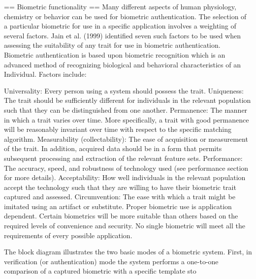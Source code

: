 \documentclass[12pt,a4paper]{report}
\begin{document}
== Biometric functionality ==
Many different aspects of human physiology, chemistry or behavior can be used for biometric authentication. The selection of a particular biometric for use in a specific application involves a weighting of several factors. Jain et al. (1999) identified seven such factors to be used when assessing the suitability of any trait for use in biometric authentication. Biometric authentication is based upon biometric recognition which is an advanced method of recognizing biological and behavioral characteristics of an Individual.
Factors include:

Universality: Every person using a system should possess the trait.
Uniqueness: The trait should be sufficiently different for individuals in the relevant population such that they can be distinguished from one another.
Permanence: The manner in which a trait varies over time. More specifically, a trait with good permanence will be reasonably invariant over time with respect to the specific matching algorithm.
Measurability (collectability): The ease of acquisition or measurement of the trait. In addition, acquired data should be in a form that permits subsequent processing and extraction of the relevant feature sets.
Performance: The accuracy, speed, and robustness of technology used (see performance section for more details).
Acceptability: How well individuals in the relevant population accept the technology such that they are willing to have their biometric trait captured and assessed.
Circumvention: The ease with which a trait might be imitated using an artifact or substitute.
Proper biometric use is application dependent. Certain biometrics will be more suitable than others based on the required levels of convenience and security. No single biometric will meet all the requirements of every possible application.

The block diagram illustrates the two basic modes of a biometric system. First, in verification (or authentication) mode the system performs a one-to-one comparison of a captured biometric with a specific template sto
\end{document}
